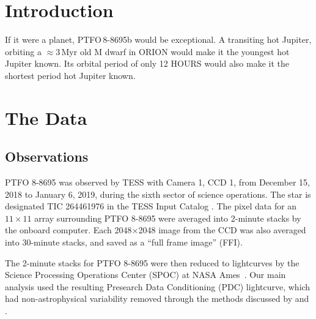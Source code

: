 \documentclass[12pt,twocolumn,tighten]{aastex62}
\begin{document}
\keywords{}


\section{Introduction}
If it were a planet, PTFO$\,$8-8695b would be exceptional.
A transiting hot Jupiter, orbiting a $\approx$3$\,$Myr old M dwarf
in ORION would make it the youngest hot Jupiter known.
Its orbital period of only 12 HOURS would also make it the shortest
period hot Jupiter known.


\section{The Data}
\label{sec:observations}

\subsection{Observations}

PTFO 8-8695 was observed by TESS with Camera 1, CCD 1, from December
15, 2018 to January 6, 2019, during the sixth sector of science
operations.  The star is designated TIC 264461976 in the TESS Input
Catalog \citep{stassun_TIC_2018,stassun_TIC8_2019}.  The pixel data for an $11\times11$
array surrounding PTFO 8-8695 were averaged into 2-minute stacks by
the onboard computer. 
Each 2048$\times$2048 image from the CCD was also averaged into
30-minute stacks, and saved as a ``full frame image'' (FFI).

The 2-minute stacks for PTFO 8-8695 were then reduced to lightcurves
by the Science Processing Operations Center (SPOC) at NASA
Ames~\citep{jenkins_tess_2016}.  Our main analysis used the resulting
Presearch Data Conditioning (PDC) lightcurve, which had
non-astrophysical variability removed through the methods discussed by
\citet{smith_kepler_apertures_2017} and \citet{smith_kepler_PDC_2017}.
\end{document}
